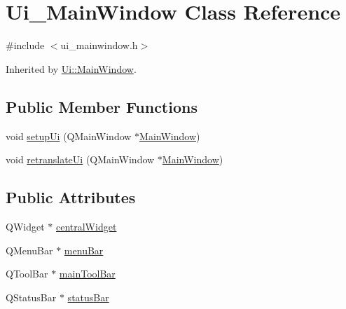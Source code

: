 \hypertarget{class_ui___main_window}{\section{Ui\-\_\-\-Main\-Window Class Reference}
\label{class_ui___main_window}
}


{\ttfamily \#include $<$ui\-\_\-mainwindow.\-h$>$}



Inherited by \hyperlink{class_ui_1_1_main_window}{Ui\-::\-Main\-Window}.

\subsection*{Public Member Functions}
\begin{DoxyCompactItemize}
\item 
void \hyperlink{class_ui___main_window_acf4a0872c4c77d8f43a2ec66ed849b58}{setup\-Ui} (Q\-Main\-Window $\ast$\hyperlink{class_main_window}{Main\-Window})
\item 
void \hyperlink{class_ui___main_window_a097dd160c3534a204904cb374412c618}{retranslate\-Ui} (Q\-Main\-Window $\ast$\hyperlink{class_main_window}{Main\-Window})
\end{DoxyCompactItemize}
\subsection*{Public Attributes}
\begin{DoxyCompactItemize}
\item 
Q\-Widget $\ast$ \hyperlink{class_ui___main_window_a30075506c2116c3ed4ff25e07ae75f81}{central\-Widget}
\item 
Q\-Menu\-Bar $\ast$ \hyperlink{class_ui___main_window_a2be1c24ec9adfca18e1dcc951931457f}{menu\-Bar}
\item 
Q\-Tool\-Bar $\ast$ \hyperlink{class_ui___main_window_a5172877001c8c7b4e0f6de50421867d1}{main\-Tool\-Bar}
\item 
Q\-Status\-Bar $\ast$ \hyperlink{class_ui___main_window_a50fa481337604bcc8bf68de18ab16ecd}{status\-Bar}
\end{DoxyCompactItemize}


